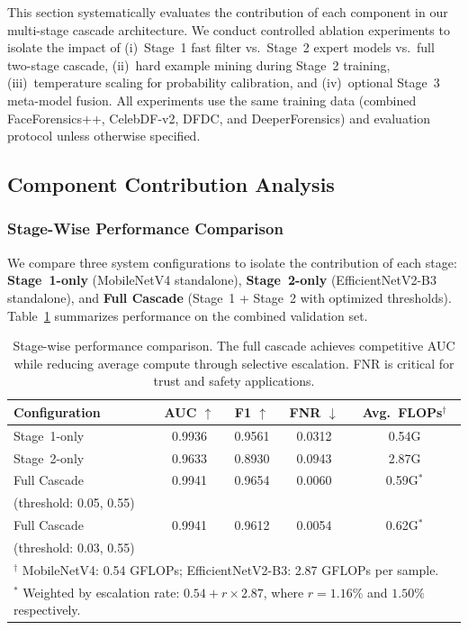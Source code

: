 This section systematically evaluates the contribution of each component in our multi\hyp stage cascade architecture. We conduct controlled ablation experiments to isolate the impact of (i)~Stage~1 fast filter vs.\ Stage~2 expert models vs.\ full two\hyp stage cascade, (ii)~hard example mining during Stage~2 training, (iii)~temperature scaling for probability calibration, and (iv)~optional Stage~3 meta\hyp model fusion. All experiments use the same training data (combined FaceForensics++, CelebDF\hyp v2, DFDC, and DeeperForensics) and evaluation protocol unless otherwise specified.

\subsection{Component Contribution Analysis}

\subsubsection{Stage-Wise Performance Comparison}
We compare three system configurations to isolate the contribution of each stage: \textbf{Stage~1\hyp only} (MobileNetV4 standalone), \textbf{Stage~2\hyp only} (EfficientNetV2\hyp B3 standalone), and \textbf{Full Cascade} (Stage~1 + Stage~2 with optimized thresholds). Table~\ref{tab:ablation_stagewise} summarizes performance on the combined validation set.

\begin{table}[h]
\centering
\caption{Stage\hyp wise performance comparison. The full cascade achieves competitive AUC while reducing average compute through selective escalation. FNR is critical for trust and safety applications.}
\label{tab:ablation_stagewise}
\begin{tabular}{@{}lcccc@{}}
\toprule
Configuration & AUC $\uparrow$ & F1 $\uparrow$ & FNR $\downarrow$ & Avg.\ FLOPs$^\dagger$ \\
\midrule
Stage~1\hyp only & 0.9936 & 0.9561 & 0.0312 & 0.54G \\
Stage~2\hyp only & 0.9633 & 0.8930 & 0.0943 & 2.87G \\
\midrule
Full Cascade & 0.9941 & 0.9654 & 0.0060 & 0.59G$^*$ \\
\quad (threshold: 0.05, 0.55) & & & & \\
Full Cascade & 0.9941 & 0.9612 & 0.0054 & 0.62G$^*$ \\
\quad (threshold: 0.03, 0.55) & & & & \\
\bottomrule
\multicolumn{5}{l}{\footnotesize $^\dagger$ MobileNetV4: 0.54 GFLOPs; EfficientNetV2\hyp B3: 2.87 GFLOPs per sample.} \\
\multicolumn{5}{l}{\footnotesize $^*$ Weighted by escalation rate: $0.54 + r \times 2.87$, where $r=1.16\%$ and $1.50\%$ respectively.}
\end{tabular}
\end{table}

